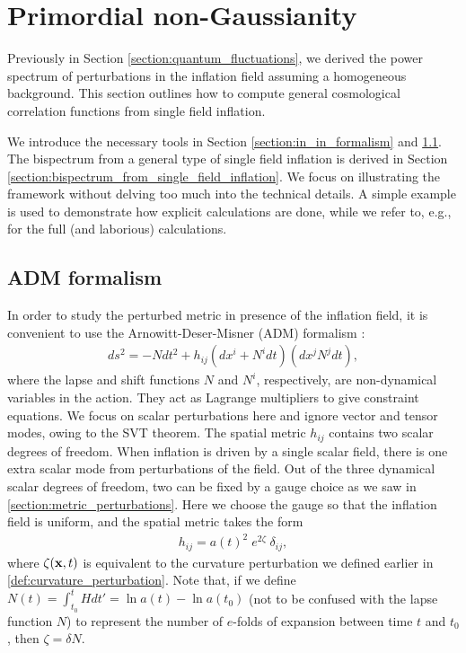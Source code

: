 \section{Primordial non-Gaussianity} \label{section:primordial_non_Gaussianity}

Previously in Section \ref{section:quantum_fluctuations}, we derived the power spectrum of perturbations in the inflation field assuming a homogeneous background. This section outlines how to compute general cosmological correlation functions from single field inflation.

We introduce the necessary tools in Section \ref{section:in_in_formalism} and \ref{section:ADM_formalism}. The bispectrum from a general type of single field inflation is derived in Section \ref{section:bispectrum_from_single_field_inflation}. We focus on illustrating the framework without delving too much into the technical details. A simple example is used to demonstrate how explicit calculations are done, while we refer to, e.g., \cite{Maldacena2013,Chen2010,Burrage2011large} for the full (and laborious) calculations.

\subsection{ADM formalism} \label{section:ADM_formalism}

In order to study the perturbed metric in presence of the inflation field, it is convenient to use the Arnowitt-Deser-Misner (ADM) formalism \cite{Arnowitt2008ADMrepublication}:
\begin{align}
	ds^2 = -N dt^2 + h_{ij}(dx^i + N^i dt) (dx^j N^j dt),
\end{align}
where the lapse and shift functions $N$ and $N^i$, respectively, are non-dynamical variables in the action. They act as Lagrange multipliers to give constraint equations. We focus on scalar perturbations here and ignore vector and tensor modes, owing to the SVT theorem. The spatial metric $h_{ij}$ contains two scalar degrees of freedom. When inflation is driven by a single scalar field, there is one extra scalar mode from perturbations of the field. Out of the three dynamical scalar degrees of freedom, two can be fixed by a gauge choice as we saw in \ref{section:metric_perturbations}. Here we choose the gauge so that the inflation field is uniform, and the spatial metric takes the form
\begin{align}
	h_{ij} = a(t)^2 \;e^{2\zeta} \; \delta_{ij},  \label{eqn:spatial_metric_curvature_perturbation}
\end{align}
where $\zeta(\mathbf{x},t)$ is equivalent to the curvature perturbation we defined earlier in \eqref{def:curvature_perturbation}. Note that, if we define $N(t) = \int^{t}_{t_0} H dt' = \ln a(t) - \ln a(t_0)$ (not to be confused with the lapse function $N$) to represent the number of $e$-folds of expansion between time $t$ and $t_0$, then $\zeta = \delta N$. 
	
